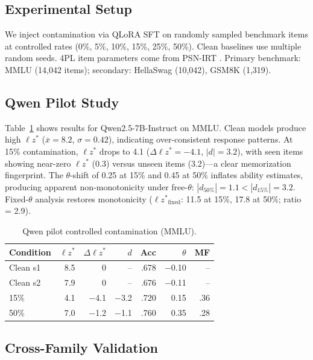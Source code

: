 \documentclass[11pt,twocolumn]{article}
\newcommand{\lzs}{\ensuremath{\ell z^*}}
\begin{document}
\subsection{Experimental Setup}

We inject contamination via QLoRA SFT \citep{dettmers2024qlora} on randomly sampled benchmark items at controlled rates (0\%, 5\%, 10\%, 15\%, 25\%, 50\%). Clean baselines use multiple random seeds. 4PL item parameters come from PSN-IRT \citep{polo2024psnirt}. Primary benchmark: MMLU (14,042 items); secondary: HellaSwag (10,042), GSM8K (1,319).

\subsection{Qwen Pilot Study}
\label{sec:qwen_pilot}

Table~\ref{tab:qwen_pilot} shows results for Qwen2.5-7B-Instruct on MMLU. Clean models produce high $\lzs$ ($\bar{x} = 8.2$, $\sigma = 0.42$), indicating over-consistent response patterns. At 15\% contamination, $\lzs$ drops to 4.1 ($\Delta\lzs = -4.1$, $|d| = 3.2$), with seen items showing near-zero $\lzs$ (0.3) versus unseen items (3.2)---a clear memorization fingerprint. The $\theta$-shift of 0.25 at 15\% and 0.45 at 50\% inflates ability estimates, producing apparent non-monotonicity under free-$\theta$: $|d_{50\%}| = 1.1 < |d_{15\%}| = 3.2$. Fixed-$\theta$ analysis restores monotonicity ($\lzs_{\text{fixed}}$: 11.5 at 15\%, 17.8 at 50\%; ratio = 2.9).

\begin{table}[t]
\centering
\caption{Qwen pilot controlled contamination (MMLU).}
\label{tab:qwen_pilot}
\footnotesize
\begin{tabular}{lrrrrrr}
\toprule
Condition & $\lzs$ & $\Delta\lzs$ & $d$ & Acc & $\theta$ & MF \\
\midrule
Clean s1 & 8.5 & 0 & -- & .678 & $-$0.10 & -- \\
Clean s2 & 7.9 & 0 & -- & .676 & $-$0.11 & -- \\
15\% & 4.1 & $-$4.1 & $-$3.2 & .720 & 0.15 & .36 \\
50\% & 7.0 & $-$1.2 & $-$1.1 & .760 & 0.35 & .28 \\
\bottomrule
\end{tabular}
\vspace{-0.3cm}
\end{table}

\subsection{Cross-Family Validation}
\end{document}
